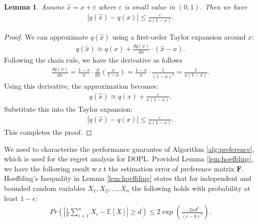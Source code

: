 \documentclass{article} %
\newcommand{\DOPL}{\textsc{DOPL}\xspace}
\newcommand{\bF}{\mathbf{F}}
\newtheorem{lemma}{Lemma}
\begin{document}
{\begin{lemma}\label{lemma:Q}
Assume $\hat{x} = x + \varepsilon$ where $\varepsilon$ is small value in $(0,1)$. Then we have
\begin{align*}
  \left| q(\hat{x}) - q(x) \right| \leq \frac{\varepsilon}{x(1-x)}.  
\end{align*}

\end{lemma}

\begin{proof}
We can approximate $q(\hat{x})$ using a first-order Taylor expansion around $x$:
\begin{align}
    q(\hat{x}) \approx q(x) + \frac{dq(x)}{dx} \cdot (\hat{x} - x).
\end{align}
Following the chain rule, we have the derivative as follows
\begin{align}
 \frac{dq(x)}{dx} = \frac{1-x}{x}\cdot\frac{d}{dx} \left(\frac{x}{1-x}\right) = \frac{1-x}{x}\cdot\frac{1}{(1-x)^2} = \frac{1}{x(1-x)}.
\end{align}
Using this derivative, the approximation becomes:
\begin{align}
   q(\hat{x}) \approx q(x) +  \frac{ \varepsilon}{x(1-x)} .
\end{align}
Substitute this into the Taylor expansion:
\begin{align}
    \left| q(\hat{x}) - q(x) \right| \leq \frac{\varepsilon}{x(1-x)}.
\end{align}
This completes the proof.
\end{proof}



We need to characterize the performance guarantee of Algorithm  \ref{alg:preference}, which is used for the regret analysis for \DOPL.
Provided Lemma \ref{lem:hoeffding}, we have the following result w.r.t the estimation error of preference matrix $\bF$.
Hoeffding's Inequality in Lemma \ref{lem:hoeffding} states that for independent and bounded random variables $X_1, X_2, \ldots, X_n$ the following holds with probability at least $1 - \epsilon$:
\begin{align}
    Pr\left(\left|\frac{1}{n}\sum_{i=1}^{n} X_i - \mathbb{E}[X]\right| \geq d\right) \leq 2 \exp\left(\frac{-2nd^2}{(c-b)^2}\right).
\end{align}

}
\end{document}
